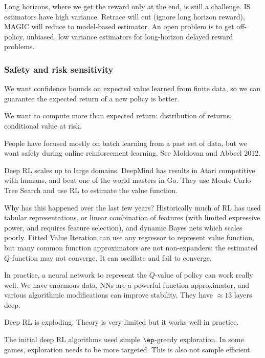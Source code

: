 %
Long horizons, where we get the reward only at the end, is still a challenge. IS estimators have high variance. Retrace will cut (ignore long horizon reward), MAGIC will reduce to model-based estimator. An open problem is to get off-policy, unbiased, low variance estimators for long-horizon delayed reward problems.


\subsubsection{Safety and risk sensitivity}

We want confidence bounds on expected value learned from finite data, so we can guarantee the expected return of a new policy is better.

We want to compute more than expected return: distribution of returns, conditional value at risk.


People have focused mostly on batch learning from a past set of data, but we want safety during online reinforcement learning. See Moldovan and Abbeel 2012. 

Deep RL scales up to large domains. DeepMind has results in Atari competitive with humans, and beat one of the world masters in Go. They use Monte Carlo Tree Search and use RL to estimate the value function. %

Why has this happened over the last few years?
Historically much of RL has used tabular representations, or linear combination of features (with limited expressive power, and requires feature selection), and dynamic Bayes nets which scales poorly. 
Fitted Value Iteration can use any regressor to represent value function, but many common function approximators are not non-expanders: the estimated $Q$-function may not converge. It can oscillate and fail to converge.

In practice, a neural network to represent the $Q$-value of policy can work really well. We have enormous data, NNs are a powerful function approximator, and various algorithmic modifications can improve stability.
 They have $\approx 13$ layers deep.

Deep RL is exploding. Theory is very limited but it works well in practice.


The initial deep RL algorithms used simple $\ep$-greedy exploration. In some games, exploration needs to be more targeted. 
This is also not sample efficient. 

